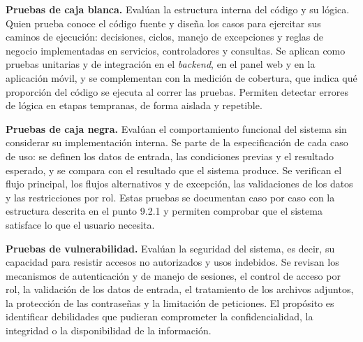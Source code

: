 \begin{incisos}
    \item \textbf{Pruebas de caja blanca.} Evalúan la estructura interna del código y su lógica. Quien prueba conoce el código fuente y diseña los casos para ejercitar sus caminos de ejecución: decisiones, ciclos, manejo de excepciones y reglas de negocio implementadas en servicios, controladores y consultas. Se aplican como pruebas unitarias y de integración en el \textit{backend}, en el panel web y en la aplicación móvil, y se complementan con la medición de cobertura, que indica qué proporción del código se ejecuta al correr las pruebas. Permiten detectar errores de lógica en etapas tempranas, de forma aislada y repetible.
    \item \textbf{Pruebas de caja negra.} Evalúan el comportamiento funcional del sistema sin considerar su implementación interna. Se parte de la especificación de cada caso de uso: se definen los datos de entrada, las condiciones previas y el resultado esperado, y se compara con el resultado que el sistema produce. Se verifican el flujo principal, los flujos alternativos y de excepción, las validaciones de los datos y las restricciones por rol. Estas pruebas se documentan caso por caso con la estructura descrita en el punto 9.2.1 y permiten comprobar que el sistema satisface lo que el usuario necesita.
    \item \textbf{Pruebas de vulnerabilidad.} Evalúan la seguridad del sistema, es decir, su capacidad para resistir accesos no autorizados y usos indebidos. Se revisan los mecanismos de autenticación y de manejo de sesiones, el control de acceso por rol, la validación de los datos de entrada, el tratamiento de los archivos adjuntos, la protección de las contraseñas y la limitación de peticiones. El propósito es identificar debilidades que pudieran comprometer la confidencialidad, la integridad o la disponibilidad de la información.
\end{incisos}
